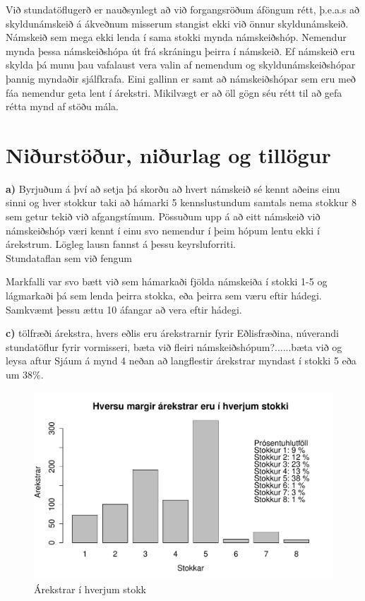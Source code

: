 \documentclass[a4paper,12pt]{article}
\begin{document}
Við stundatöflugerð er nauðsynlegt að við forgangsröðum áföngum rétt, þ.e.a.s að skyldunámskeið á ákveðnum misserum stangist ekki við önnur skyldunámskeið. Námskeið sem mega ekki lenda í sama stokki mynda námskeiðshóp. Nemendur mynda þessa námskeiðshópa út frá skráningu þeirra í námskeið. Ef námskeið eru skylda þá munu þau vafalaust vera valin af nemendum og skyldunámskeiðshópar þannig myndaðir sjálfkrafa. Eini gallinn er samt að námskeiðshópar sem eru með fáa nemendur geta lent í árekstri. Mikilvægt er að öll gögn séu rétt til að gefa rétta mynd af stöðu mála. 

\section{Niðurstöður, niðurlag og tillögur}

\textbf{a)} Byrjuðum á því að setja þá skorðu að hvert námskeið sé kennt aðeins einu sinni og hver stokkur taki að hámarki 5 kennslustundum samtals nema stokkur 8 sem getur tekið við afgangstímum. Pössuðum upp á að eitt námskeið við námskeiðshóp væri kennt í einu svo nemendur í þeim hópum lentu ekki í árekstrum. Lögleg lausn fannst á þessu keyrsluforriti.\\
Stundataflan sem við fengum


Markfalli var svo bætt við sem hámarkaði fjölda námskeiða í stokki 1-5 og lágmarkaði þá sem lenda þeirra stokka, eða þeirra sem væru eftir hádegi. Samkvæmt þessu ættu 10 áfangar að vera eftir hádegi.

\textbf{c) }tölfræði árekstra, hvers eðlis eru árekstrarnir fyrir Eðlisfræðina, núverandi stundatöflur fyrir vormisseri, bæta við fleiri námskeiðshópum?......bæta við og leysa aftur
Sjáum á mynd 4 neðan að langflestir árekstrar myndast í stokki 5 eða um 38$\%$. 
\begin{figure}[ht!]
\centering
\includegraphics[width=120mm]{c_lidur_plot}
\caption{Árekstrar í hverjum stokk}
\label{fig: arekstrar}
\end{figure}
\end{document}
